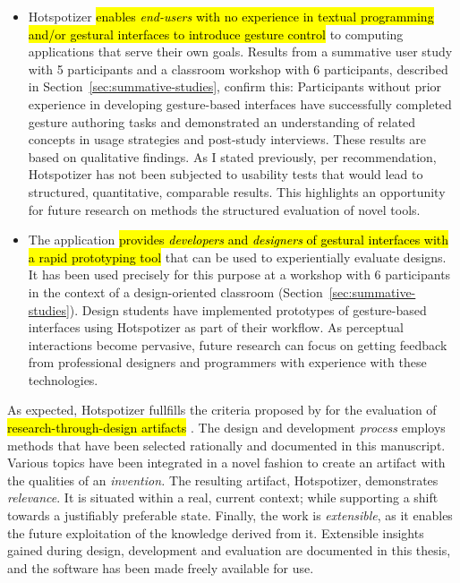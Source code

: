 \begin{itemize}
\item Hotspotizer \hl{enables \emph{end-users} with no experience in textual programming and/or gestural interfaces to introduce gesture control} to computing applications that serve their own goals. Results from a summative user study with 5 participants and a classroom workshop with 6 participants, described in Section~\ref{sec:summative-studies}, confirm this: Participants without prior experience in developing gesture-based interfaces have successfully completed gesture authoring tasks and demonstrated an understanding of related concepts in usage strategies and post-study interviews. These results are based on qualitative findings. As I stated previously, per  recommendation, Hotspotizer has not been subjected to usability tests that would lead to structured, quantitative, comparable results. This highlights an opportunity for future research on methods the structured evaluation of novel tools.
\item The application \hl{provides \emph{developers} and \emph{designers} of gestural interfaces with a rapid prototyping tool} that can be used to experientially evaluate designs. It has been used precisely for this purpose at a workshop with 6 participants in the context of a design-oriented classroom (Section~\ref{sec:summative-studies}). Design students have implemented prototypes of gesture-based interfaces using Hotspotizer as part of their workflow. As perceptual interactions become pervasive, future research can focus on getting feedback from professional designers and programmers with experience with these technologies.
\end{itemize}

As expected, Hotspotizer fullfills the criteria proposed by \textcite{Zimmerman:2007} for the evaluation of \hl{research-through-design artifacts} \parencite{Frayling:1993}. The design and development \emph{process} employs methods that have been selected rationally and documented in this manuscript. Various topics have been integrated in a novel fashion to create an artifact with the qualities of an \emph{invention.} The resulting artifact, Hotspotizer, demonstrates \emph{relevance}. It is situated within a real, current context; while supporting a shift towards a justifiably preferable state. Finally, the work is \emph{extensible}, as it enables the future exploitation of the knowledge derived from it. Extensible insights gained during design, development and evaluation are documented in this thesis, and the software has been made freely available for use.

